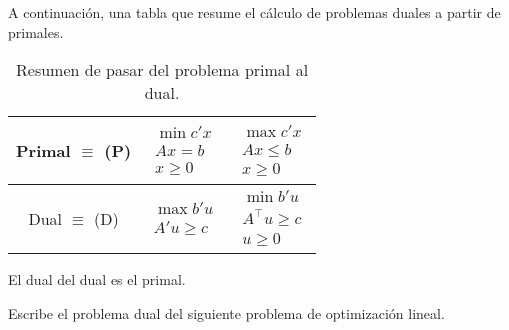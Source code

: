 A continuación, una tabla que resume el cálculo de problemas duales a partir de primales.
\begin{table}[hbtp]
\centering
\begin{tabular}{c|c|c}
	Primal $\equiv$ (P) &
	$\begin{array}{c} \min c'x\\Ax = b\\x≥ 0\end{array}$ & 
	$\begin{array}{c} \max c'x\\Ax ≤ b\\x≥ 0\end{array}$
\\
\hline
	Dual $\equiv$ (D) & 
	$\begin{array}{c} \max b'u\\A'u ≥ c\end{array}$ & 
	$\begin{array}{c} \min b'u\\A^\top u ≥ c\\u≥ 0\end{array}$
\\
\end{tabular}
\caption{Resumen de pasar del problema primal al dual.}
\end{table}

\obs El dual del dual es el primal.

\begin{example}
Escribe el problema dual del siguiente problema de optimización lineal.

\begin{ioprob}
\end{ioprob}



\begin{ioprob}
\end{ioprob}

\end{example}

